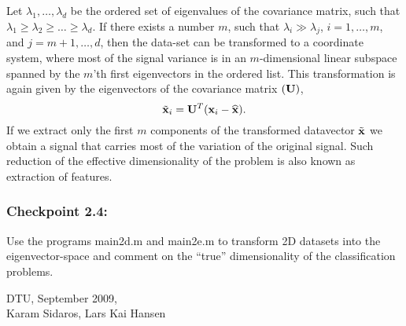 \documentclass[times,12pt]{article}    %
\def\x{{\bf x}}
\def\U{{\bf U}}
\begin{document}
Let $\lambda_1, \ldots, \lambda_d$ be the ordered set of eigenvalues
of the covariance matrix, such that $\lambda_1 \ge \lambda_2 \ge \ldots
\ge \lambda_d$. If there exists a number $m$, such that $\lambda_i \gg
\lambda_j$, $i = 1,\ldots,m$, and $j=m+1,\ldots,d$, then the data-set
can be transformed to a coordinate system, where most of the
signal variance is in an $m$-dimensional linear subspace  spanned by the $m$'th  first eigenvectors
in the ordered list. This transformation is again given by the eigenvectors of the
covariance matrix $(\U)$,
\begin{equation}
  \label{eq:trans2}
  \tilde{\x}_i= \U^T(\x_i-\widehat{\x}).
\end{equation}
If we extract only the first $m$ components of the transformed datavector $\tilde{\x}$
we obtain a signal that carries most of the variation of the original signal.
Such reduction of the effective dimensionality of the problem is also known
as extraction of features.

\subsubsection*{Checkpoint 2.4:}
Use the programs {\sf main2d.m} and {\sf main2e.m} to transform 2D
datasets into the eigenvector-space and comment on the ``true'' dimensionality
of the classification problems.

%

\vspace*{2cm}
\noindent DTU, September 2009,\\[2mm]
Karam Sidaros, Lars Kai Hansen
\end{document}
